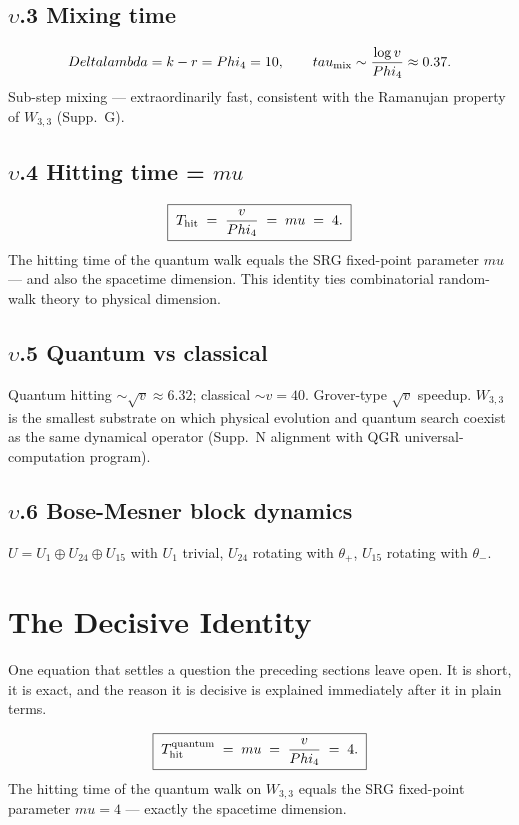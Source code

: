 \documentclass[12pt,a4paper]{article}
\def\Delta{Delta}%
\def\lambda{lambda}%
\def\mu{mu}%
\def\Phi#1{Phi#1}%
\def\tau{tau}%
\theoremstyle{definition}
\begin{document}
\subsection*{$\upsilon$.3 \quad Mixing time}
\[
\Delta\lambda = k - r = \Phi_4 = 10,\qquad
\tau_{\rm mix} \sim \frac{\log v}{\Phi_4} \approx 0.37.
\]
Sub-step mixing — extraordinarily fast, consistent with the Ramanujan
property of $W_{3,3}$ (Supp.~G).

\subsection*{$\upsilon$.4 \quad Hitting time = $\mu$}
\[
\boxed{\;T_{\rm hit} \;=\; \frac{v}{\Phi_4} \;=\; \mu \;=\; 4.\;}
\]
The hitting time of the quantum walk equals the SRG fixed-point
parameter $\mu$ — and also the spacetime dimension. This identity
ties combinatorial random-walk theory to physical dimension.

\subsection*{$\upsilon$.5 \quad Quantum vs classical}
Quantum hitting $\sim\sqrt{v}\approx 6.32$; classical $\sim v=40$.
Grover-type $\sqrt{v}$ speedup. $W_{3,3}$ is the smallest substrate on
which physical evolution and quantum search coexist as the same
dynamical operator (Supp.~N alignment with QGR universal-computation
program).

\subsection*{$\upsilon$.6 \quad Bose-Mesner block dynamics}
$U = U_1 \oplus U_{24} \oplus U_{15}$ with $U_1$ trivial, $U_{24}$
rotating with $\theta_+$, $U_{15}$ rotating with $\theta_-$.

\section*{The Decisive Identity}

\begin{plainbox}
One equation that settles a question the preceding sections leave open. It is short,
it is exact, and the reason it is decisive is explained immediately after it in plain
terms.
\end{plainbox}


\[
\boxed{\;T_{\rm hit}^{\rm quantum} \;=\; \mu \;=\; \frac{v}{\Phi_4} \;=\; 4.\;}
\]
The hitting time of the quantum walk on $W_{3,3}$ equals the SRG
fixed-point parameter $\mu = 4$ — exactly the spacetime dimension.
\end{document}
